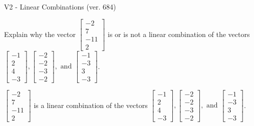 \begin{exercise}
  \begin{exerciseTitle}V2 - Linear Combinations (ver. 684)\end{exerciseTitle}
  \begin{exerciseStatement}
    Explain why the vector \(\left[\begin{array}{c}
-2 \\
7 \\
-11 \\
2
\end{array}\right]\)  is or is not a linear 
	combination of the vectors \(\left[\begin{array}{c}
-1 \\
2 \\
4 \\
-3
\end{array}\right] , \left[\begin{array}{c}
-2 \\
-2 \\
-3 \\
-2
\end{array}\right] , \text{ and } \left[\begin{array}{c}
-1 \\
-3 \\
3 \\
-3
\end{array}\right]\).
	


  \end{exerciseStatement}
  \begin{exerciseAnswer}
   \(\left[\begin{array}{c}
-2 \\
7 \\
-11 \\
2
\end{array}\right]\) 
  	 is  
	a linear combination of the vectors \(\left[\begin{array}{c}
-1 \\
2 \\
4 \\
-3
\end{array}\right] , \left[\begin{array}{c}
-2 \\
-2 \\
-3 \\
-2
\end{array}\right] , \text{ and } \left[\begin{array}{c}
-1 \\
-3 \\
3 \\
-3
\end{array}\right]\).

	
  


  \end{exerciseAnswer}
\end{exercise}